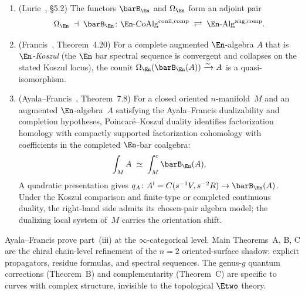 \begin{theorem}
\label{thm:en-koszul-duality}
\begin{enumerate}[label=\textup{(\roman*)}]
\item \textup{(Lurie~\cite{HA}, \S5.2)}\quad
 The functors $\barB_{\En}$ and $\Omega_{\En}$ form an adjoint pair
 \[
 \Omega_{\En}
 \;\dashv\;
 \barB_{\En}
 \colon
 \En\text{-}\mathrm{CoAlg}^{\mathrm{conil,comp}}
 \;\rightleftarrows\;
 \En\text{-}\mathrm{Alg}^{\mathrm{aug,comp}}.
 \]
\item \textup{(Francis~\cite{Francis2013}, Theorem~4.20)}\quad
 For a complete augmented $\En$-algebra $A$ that is
 \emph{$\En$-Koszul}
 \textup{(}the $\En$ bar spectral sequence is convergent and
 collapses on the stated Koszul locus\textup{)},
 the counit
 $\Omega_{\En}(\barB_{\En}(A)) \xrightarrow{\sim} A$
 is a quasi-isomorphism.
\item \textup{(Ayala--Francis~\cite{AF15}, Theorem~7.8)}\quad
 For a closed oriented $n$-manifold~$M$ and an augmented
 $\En$-algebra~$A$ satisfying the Ayala--Francis dualizability and
 completion hypotheses, Poincar\'e--Koszul duality identifies
 factorization homology with compactly supported factorization
 cohomology with coefficients in the completed $\En$-bar coalgebra:
 \begin{equation}\label{eq:poincare-koszul}
 \int_M A
 \;\simeq\;
 \int_M^c \barB_{\En}(A).
 \end{equation}
 A quadratic presentation gives
 $q_A\colon A^{\mathrm i}=C(s^{-1}V,s^{-2}R)\to\barB_{\En}(A)$.
 Under the Koszul comparison and finite-type or completed continuous
 duality, the right-hand side admits its chosen-pair algebra model;
 the dualizing local system of~$M$ carries the orientation shift.
\end{enumerate}
\end{theorem}

\begin{remark}
\label{rem:chain-level-en}
Ayala--Francis prove part~(iii) at the $\infty$-categorical level.
Main Theorems~A, B, C are the chiral chain-level refinement of the
$n = 2$ oriented-surface shadow:
explicit propagators, residue formulas, and spectral sequences.
The genus-$g$ quantum corrections (Theorem~B) and complementarity
(Theorem~C) are specific to curves with complex structure, invisible
to the topological $\Etwo$ theory.
\end{remark}

